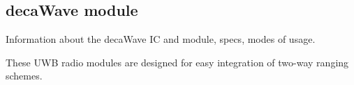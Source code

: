 \subsection{decaWave module}

Information about the decaWave IC and module, specs, modes of usage.

These UWB radio modules are designed for easy integration of two-way ranging schemes.

